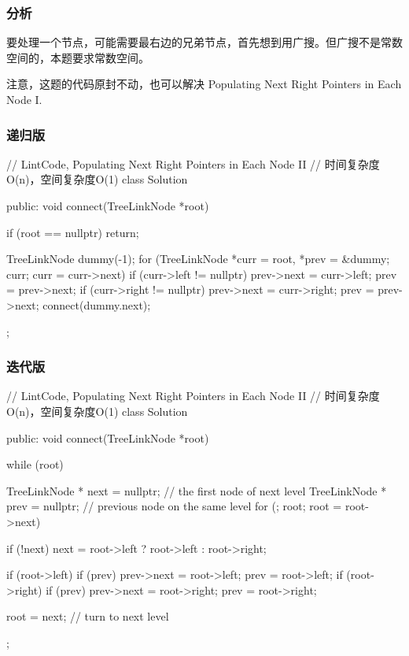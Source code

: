 \subsubsection{分析}
要处理一个节点，可能需要最右边的兄弟节点，首先想到用广搜。但广搜不是常数空间的，本题要求常数空间。

注意，这题的代码原封不动，也可以解决 Populating Next Right Pointers in Each Node I.


\subsubsection{递归版}
\begin{Code}
// LintCode, Populating Next Right Pointers in Each Node II
// 时间复杂度O(n)，空间复杂度O(1)
class Solution {
public:
    void connect(TreeLinkNode *root) {
        if (root == nullptr) return;

        TreeLinkNode dummy(-1);
        for (TreeLinkNode *curr = root, *prev = &dummy; 
                curr; curr = curr->next) {
            if (curr->left != nullptr){
                prev->next = curr->left;
                prev = prev->next;
            }
            if (curr->right != nullptr){
                prev->next = curr->right;
                prev = prev->next;
            }
        }
        connect(dummy.next);
    }
};
\end{Code}


\subsubsection{迭代版}
\begin{Code}
// LintCode, Populating Next Right Pointers in Each Node II
// 时间复杂度O(n)，空间复杂度O(1)
class Solution {
public:
    void connect(TreeLinkNode *root) {
        while (root) {
            TreeLinkNode * next = nullptr; // the first node of next level
            TreeLinkNode * prev = nullptr; // previous node on the same level
            for (; root; root = root->next) {
                if (!next) next = root->left ? root->left : root->right;

                if (root->left) {
                    if (prev) prev->next = root->left;
                    prev = root->left;
                }
                if (root->right) {
                    if (prev) prev->next = root->right;
                    prev = root->right;
                }
            }
            root = next; // turn to next level
        }
    }
};
\end{Code}


